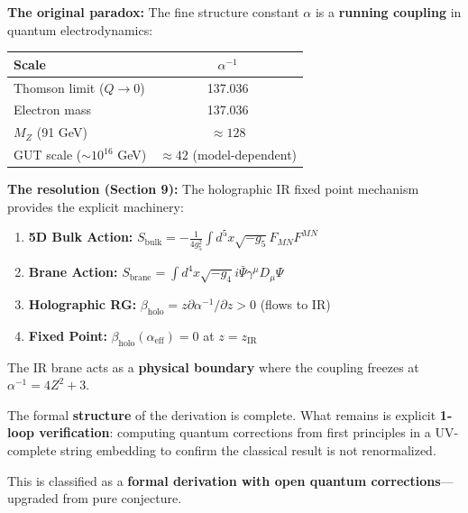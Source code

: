 \documentclass[12pt,a4paper]{article}
\newcommand{\Zsq}{Z^2}
\begin{document}
\begin{tcolorbox}[colback=green!5!white, colframe=green!60!black, title=Theoretical Resolution (v8.4.0)]
\textbf{The original paradox:} The fine structure constant $\alpha$ is a \textbf{running coupling} in quantum electrodynamics:

\begin{center}
\begin{tabular}{lc}
\toprule
\textbf{Scale} & $\alpha^{-1}$ \\
\midrule
Thomson limit ($Q \to 0$) & 137.036 \\
Electron mass & 137.036 \\
$M_Z$ (91 GeV) & $\approx 128$ \\
GUT scale ($\sim 10^{16}$ GeV) & $\approx 42$ (model-dependent) \\
\bottomrule
\end{tabular}
\end{center}

\textbf{The resolution (Section 9):} The holographic IR fixed point mechanism provides the explicit machinery:
\begin{enumerate}
    \item \textbf{5D Bulk Action:} $S_{\text{bulk}} = -\frac{1}{4g_5^2}\int d^5x\sqrt{-g_5}F_{MN}F^{MN}$
    \item \textbf{Brane Action:} $S_{\text{brane}} = \int d^4x\sqrt{-g_4}i\bar{\Psi}\gamma^\mu D_\mu\Psi$
    \item \textbf{Holographic RG:} $\beta_{\text{holo}} = z\partial\alpha^{-1}/\partial z > 0$ (flows to IR)
    \item \textbf{Fixed Point:} $\beta_{\text{holo}}(\alpha_{\text{eff}}) = 0$ at $z = z_{\text{IR}}$
\end{enumerate}

The IR brane acts as a \textbf{physical boundary} where the coupling freezes at $\alpha^{-1} = 4\Zsq + 3$.
\end{tcolorbox}

\begin{tcolorbox}[colback=yellow!10!white, colframe=orange!75!black, title=Remaining Quantum Gap]
The formal \textbf{structure} of the derivation is complete. What remains is explicit \textbf{1-loop verification}: computing quantum corrections from first principles in a UV-complete string embedding to confirm the classical result is not renormalized.

This is classified as a \textbf{formal derivation with open quantum corrections}---upgraded from pure conjecture.
\end{tcolorbox}
\end{document}
